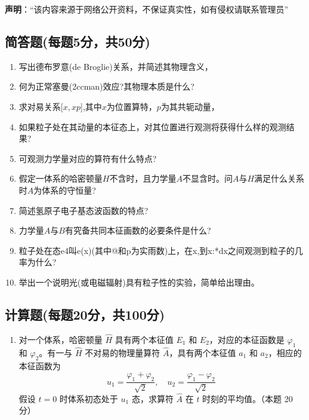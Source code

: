 
\textbf{声明}：“该内容来源于网络公开资料，不保证真实性，如有侵权请联系管理员”

\subsection{简答题(每题5分，共50分)}
\begin{enumerate}
\item 写出德布罗意(de Broglie)关系，并简述其物理含义，
\item 何为正常塞曼(2ccman)效应?其物理本质是什么?
\item 求对易关系[$x,xp$],其中$x$为位置算特，$p$为其共轭动量，
\item 如果粒子处在其动量的本征态上，对其位置进行观测将获得什么样的观测结果?
\item 可观测力学量对应的算符有什么特点?
\item 假定一体系的哈密顿量$H$不含时，且力学量$A$不显含时。问$A$与$H$满足什么关系时$A$为体系的守恒量?
\item 简述氢原子电子基态波函数的特点?
\item 力学量$A$与$B$有究备共同本征画数的必要条件是什么?
\item 粒子处在态e4叫e(x)(其中@和p为实雨数)上，在x,到x:*dx之间观测到粒子的几率为什么?
\item 举出一个说明光(或电磁辐射)具有粒子性的实验，简单给出理由。
\end{enumerate}
\subsection{计算题(每题20分，共100分)}
\begin{enumerate}
\item 对一个体系，哈密顿量 $\hat{H}$ 具有两个本征值 $E_1$ 和 $E_2$，对应的本征函数是 $\varphi_1$ 和 $\varphi_2$。有一与 $\hat{H}$ 不对易的物理量算符 $\hat{A}$，具有两个本征值 $a_1$ 和 $a_2$，相应的本征函数为
$$u_1 = \frac{\varphi_1 + \varphi_2}{\sqrt{2}}, \quad u_2 = \frac{\varphi_1 - \varphi_2}{\sqrt{2}}~$$
假设 $t=0$ 时体系初态处于 $u_1$ 态，求算符 $\hat{A}$ 在 $t$ 时刻的平均值。（本题 20 分）
\end{enumerate}

